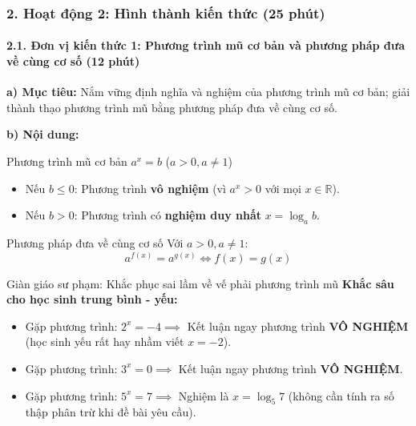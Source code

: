 \documentclass[12pt, a4paper]{article}
\begin{document}
\subsubsection*{2. Hoạt động 2: Hình thành kiến thức (25 phút)}

\paragraph{2.1. Đơn vị kiến thức 1: Phương trình mũ cơ bản và phương pháp đưa về cùng cơ số (12 phút)}

\noindent \textbf{a) Mục tiêu:}
Nắm vững định nghĩa và nghiệm của phương trình mũ cơ bản; giải thành thạo phương trình mũ bằng phương pháp đưa về cùng cơ số.

\noindent \textbf{b) Nội dung:}
\begin{pedabox}{Phương trình mũ cơ bản $a^x = b$ ($a > 0, a \neq 1$)}
\begin{itemize}[leftmargin=0.6cm]
    \item Nếu $b \le 0$: Phương trình \textbf{vô nghiệm} (vì $a^x > 0$ với mọi $x \in \mathbb{R}$).
    \item Nếu $b > 0$: Phương trình có \textbf{nghiệm duy nhất} $x = \log_a b$.
\end{itemize}
\end{pedabox}

\begin{pedabox}{Phương pháp đưa về cùng cơ số}
Với $a > 0, a \neq 1$:
$$a^{f(x)} = a^{g(x)} \iff f(x) = g(x)$$
\end{pedabox}

\begin{scaffoldbox}{Giàn giáo sư phạm: Khắc phục sai lầm về vế phải phương trình mũ}
\textbf{Khắc sâu cho học sinh trung bình - yếu:}
\begin{itemize}
    \item Gặp phương trình: $2^x = -4 \implies$ Kết luận ngay phương trình \textbf{VÔ NGHIỆM} (học sinh yếu rất hay nhầm viết $x = -2$).
    \item Gặp phương trình: $3^x = 0 \implies$ Kết luận ngay phương trình \textbf{VÔ NGHIỆM}.
    \item Gặp phương trình: $5^x = 7 \implies$ Nghiệm là $x = \log_5 7$ (không cần tính ra số thập phân trừ khi đề bài yêu cầu).
\end{itemize}
\end{scaffoldbox}
\end{document}
